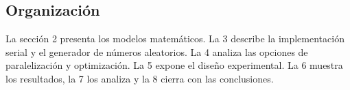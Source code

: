 \subsection*{Organización}

La sección 2 presenta los modelos matemáticos. La 3 describe la implementación serial y el generador de números aleatorios. La 4 analiza las opciones de paralelización y optimización. La 5 expone el diseño experimental. La 6 muestra los resultados, la 7 los analiza y la 8 cierra con las conclusiones.
